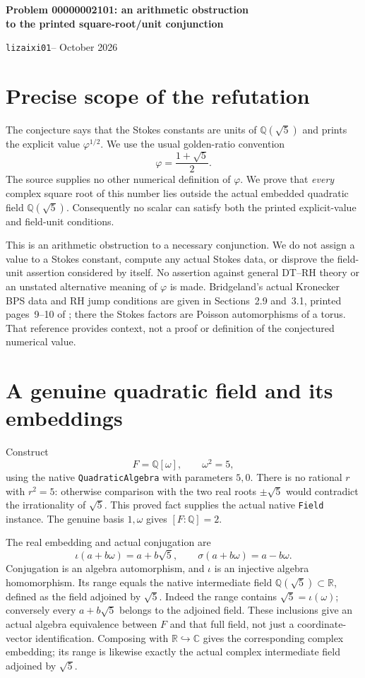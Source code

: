 \documentclass[10pt,a4paper]{article}
\newcommand{\Q}{\mathbb Q}
\newcommand{\R}{\mathbb R}
\newcommand{\C}{\mathbb C}
\begin{document}
\begin{center}
{\Large\bfseries Problem 00000002101: an arithmetic obstruction\\
to the printed square-root/unit conjunction}\par
\smallskip
\texttt{lizaixi01}\quad --  October 2026
\end{center}

\section*{Precise scope of the refutation}
The conjecture says that the Stokes constants are units of $\Q(\sqrt5)$
and prints the explicit value $\varphi^{1/2}$. We use the usual
golden-ratio convention
\[
 \varphi=\frac{1+\sqrt5}{2}.
\]
The source supplies no other numerical definition of $\varphi$.
We prove that \emph{every} complex square root of this number lies outside
the actual embedded quadratic field $\Q(\sqrt5)$. Consequently no scalar
can satisfy both the printed explicit-value and field-unit conditions.

This is an arithmetic obstruction to a necessary conjunction. We do not
assign a value to a Stokes constant, compute any actual Stokes data,
or disprove the field-unit assertion considered by itself. No assertion
against general DT--RH theory or an unstated alternative meaning of
$\varphi$ is made. Bridgeland's actual Kronecker BPS data and RH jump
conditions are given in Sections~2.9 and~3.1, printed pages~9--10 of
\cite{Bridgeland}; there the Stokes factors are Poisson automorphisms of
a torus. That reference provides context, not a proof or definition of
the conjectured numerical value.

\section*{A genuine quadratic field and its embeddings}
Construct
\[
 F=\Q[\omega],\qquad \omega^2=5,
\]
using the native \texttt{QuadraticAlgebra} with parameters $5,0$.
There is no rational $r$ with $r^2=5$: otherwise comparison with the two
real roots $\pm\sqrt5$ would contradict the irrationality of $\sqrt5$.
This proved fact supplies the actual native \texttt{Field} instance.
The genuine basis $1,\omega$ gives $[F:\Q]=2$.

The real embedding and actual conjugation are
\[
 \iota(a+b\omega)=a+b\sqrt5,
 \qquad \sigma(a+b\omega)=a-b\omega.
\]
Conjugation is an algebra automorphism, and $\iota$ is an injective algebra
homomorphism. Its range equals the native intermediate field
$\Q(\sqrt5)\subset\R$, defined as the field adjoined by $\sqrt5$.
Indeed the range contains $\sqrt5=\iota(\omega)$; conversely every
$a+b\sqrt5$ belongs to the adjoined field. These inclusions give an
actual algebra equivalence between $F$ and that full field, not just a
coordinate-vector identification. Composing with $\R\hookrightarrow\C$
gives the corresponding complex embedding; its range is likewise
exactly the actual complex intermediate field adjoined by $\sqrt5$.
\end{document}
